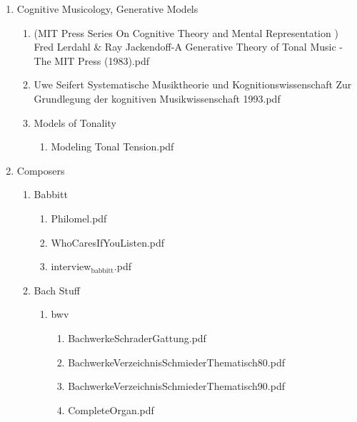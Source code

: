 \documentclass[11pt]{article}
\begin{document}
\begin{enumerate}
\item Cognitive Musicology, Generative Models
\label{sec-1-1-1-1-31-6}
\begin{enumerate}
\item (MIT Press Series On Cognitive Theory and Mental Representation ) Fred Lerdahl \& Ray Jackendoff-A Generative Theory of Tonal Music  -The MIT Press (1983).pdf
\label{sec-1-1-1-1-31-6-1}

\item Uwe Seifert Systematische Musiktheorie und Kognitionswissenschaft Zur Grundlegung der kognitiven Musikwissenschaft  1993.pdf
\label{sec-1-1-1-1-31-6-2}

\item Models of Tonality
\label{sec-1-1-1-1-31-6-3}
\begin{enumerate}
\item Modeling Tonal Tension.pdf
\label{sec-1-1-1-1-31-6-3-1}
\end{enumerate}
\end{enumerate}

\item Composers
\label{sec-1-1-1-1-31-7}
\begin{enumerate}
\item Babbitt
\label{sec-1-1-1-1-31-7-1}
\begin{enumerate}
\item Philomel.pdf
\label{sec-1-1-1-1-31-7-1-1}

\item WhoCaresIfYouListen.pdf
\label{sec-1-1-1-1-31-7-1-2}

\item interview$_{\text{babbitt}}$.pdf
\label{sec-1-1-1-1-31-7-1-3}
\end{enumerate}

\item Bach Stuff
\label{sec-1-1-1-1-31-7-2}
\begin{enumerate}
\item bwv
\label{sec-1-1-1-1-31-7-2-1}
\begin{enumerate}
\item BachwerkeSchraderGattung.pdf
\label{sec-1-1-1-1-31-7-2-1-1}

\item BachwerkeVerzeichnisSchmiederThematisch80.pdf
\label{sec-1-1-1-1-31-7-2-1-2}

\item BachwerkeVerzeichnisSchmiederThematisch90.pdf
\label{sec-1-1-1-1-31-7-2-1-3}

\item CompleteOrgan.pdf
\label{sec-1-1-1-1-31-7-2-1-4}


\end{enumerate}
\end{enumerate}
\end{enumerate}
\end{enumerate}
\end{document}
